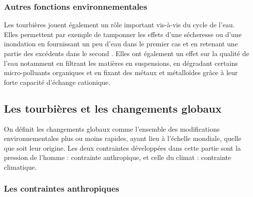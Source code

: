 \subsubsection{Autres fonctions environnementales}

Les tourbières jouent également un rôle important vis-à-vis du cycle de l'eau.
Elles permettent par exemple de tamponner les effets d'une sécheresse ou d'une inondation en fournissant un peu d'eau dans le premier cas et en retenant une partie des excédents dans le second \citep{joosten2002,parish2008}.
Elles ont également un effet sur la qualité de l'eau notamment en filtrant les matières en suspensions, en dégradant certains micro-polluants organiques et en fixant des métaux et métalloïdes grâce à leur forte capacité d'échange cationique.


\subsection{Les tourbières et les changements globaux}
On définit les changements globaux comme l'ensemble des modifications environnementales plus ou moins rapides, ayant lieu à l'échelle mondiale, quelle que soit leur origine. Les deux contraintes développées dans cette partie sont la pression de l'homme : contrainte anthropique, et celle du climat : contrainte climatique.

\subsubsection{Les contraintes anthropiques}

